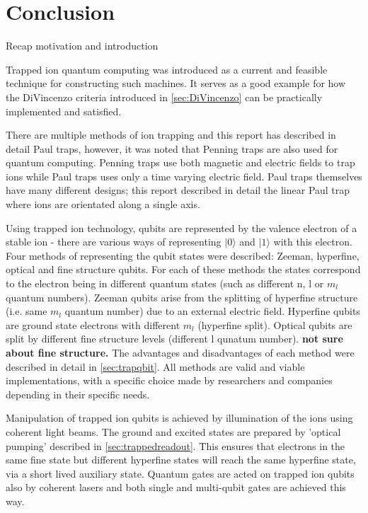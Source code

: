 \section{Conclusion}

Recap motivation and introduction

Trapped ion quantum computing was introduced as a current and feasible technique for constructing such machines. It serves as a good example for how the DiVincenzo criteria introduced in \cref{sec:DiVincenzo} can be practically implemented and satisfied.

There are multiple methods of ion trapping and this report has described in detail Paul traps, however, it was noted that Penning traps are also used for quantum computing.
Penning traps use both magnetic and electric fields to trap ions while Paul traps uses only a time varying electric field. Paul traps themselves have many different designs; this report described in detail the linear Paul trap where ions are orientated along a single axis.

Using trapped ion technology, qubits are represented by the valence electron of a stable ion - there are various ways of representing $|0\rangle$ and $|1\rangle$  with this electron.
Four methods of representing the qubit states were described: Zeeman, hyperfine, optical and fine structure qubits. 
For each of these methods the states correspond to the electron being in different quantum states (such as different n, l or $m_l$ quantum numbers).
Zeeman qubits arise from the splitting of hyperfine structure (i.e. same $m_l$ quantum number) due to an external electric field. 
Hyperfine qubits are ground state electrons with different $m_l$ (hyperfine split). 
Optical qubits are split by different fine structure levels (different l qunatum number). 
{\bf not sure about 
fine structure.}
The advantages and disadvantages of each method were described in detail in \cref{sec:trapqbit}. All methods are valid and viable implementations, with a specific choice made by researchers and companies depending in their specific needs. 

Manipulation of trapped ion qubits is achieved by illumination of the ions using coherent light beams.
The ground and excited states are prepared by 'optical pumping' described in \cref{sec:trappedreadout}.
This ensures that electrons in the same fine state but different hyperfine states will reach the same hyperfine state, via a short lived auxiliary state.
Quantum gates are acted on trapped ion qubits also by coherent lasers and both single and multi-qubit gates are achieved this way.

